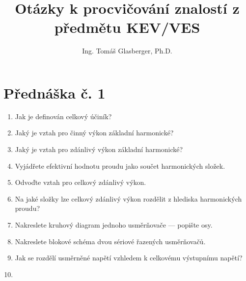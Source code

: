 \documentclass[a4paper, 12pt]{article}
\title{Otázky k procvičování znalostí z předmětu KEV/VES}
\author{Ing. Tomáš Glasberger, Ph.D.}
\begin{document}
\maketitle
\section{Přednáška č. 1}
\begin{enumerate}
    \item Jak je definován celkový účiník?
    \item Jaký je vztah pro činný výkon základní harmonické?
    \item Jaký je vztah pro zdánlivý výkon základní harmonické?
    \item Vyjádřete efektivní hodnotu proudu jako součet harmonických složek.
    \item Odvoďte vztah pro celkový zdánlivý výkon.
    \item Na jaké složky lze celkový zdánlivý výkon rozdělit z hlediska harmonických proudu?
    \item Nakreslete kruhový diagram jednoho usměrňovače --- popište osy.
    \item Nakreslete blokové schéma dvou sériové řazených usměrňovačů. 
    \item Jak se rozdělí usměrněné napětí vzhledem k celkovému výstupnímu napětí?
    \item 
\end{enumerate}
\end{document}
